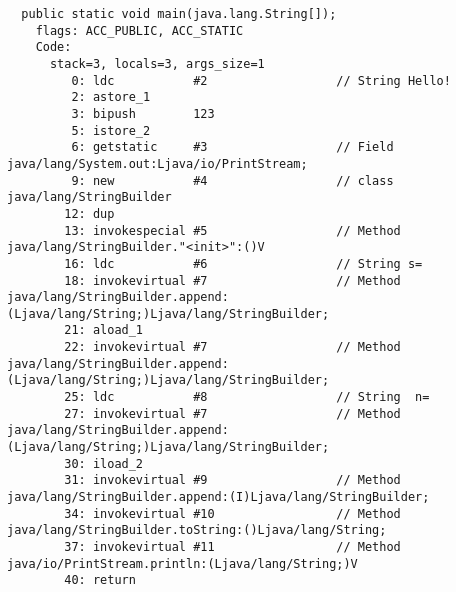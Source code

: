 
\begin{lstlisting}
  public static void main(java.lang.String[]);
    flags: ACC_PUBLIC, ACC_STATIC
    Code:
      stack=3, locals=3, args_size=1
         0: ldc           #2                  // String Hello!
         2: astore_1      
         3: bipush        123
         5: istore_2      
         6: getstatic     #3                  // Field java/lang/System.out:Ljava/io/PrintStream;
         9: new           #4                  // class java/lang/StringBuilder
        12: dup           
        13: invokespecial #5                  // Method java/lang/StringBuilder."<init>":()V
        16: ldc           #6                  // String s=
        18: invokevirtual #7                  // Method java/lang/StringBuilder.append:(Ljava/lang/String;)Ljava/lang/StringBuilder;
        21: aload_1       
        22: invokevirtual #7                  // Method java/lang/StringBuilder.append:(Ljava/lang/String;)Ljava/lang/StringBuilder;
        25: ldc           #8                  // String  n=
        27: invokevirtual #7                  // Method java/lang/StringBuilder.append:(Ljava/lang/String;)Ljava/lang/StringBuilder;
        30: iload_2       
        31: invokevirtual #9                  // Method java/lang/StringBuilder.append:(I)Ljava/lang/StringBuilder;
        34: invokevirtual #10                 // Method java/lang/StringBuilder.toString:()Ljava/lang/String;
        37: invokevirtual #11                 // Method java/io/PrintStream.println:(Ljava/lang/String;)V
        40: return        
\end{lstlisting}
